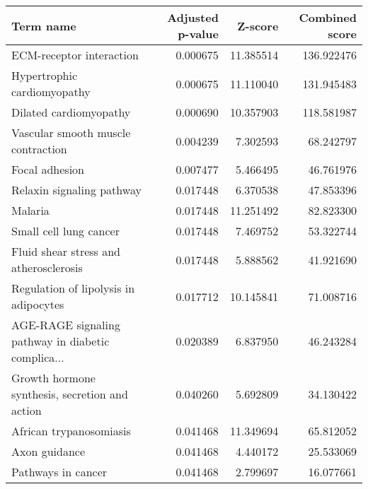 \begin{tabular}{lrrr}
\toprule
                                         Term name &  Adjusted p-value &   Z-score &  Combined score \\
\midrule
                          ECM-receptor interaction &          0.000675 & 11.385514 &      136.922476 \\
                       Hypertrophic cardiomyopathy &          0.000675 & 11.110040 &      131.945483 \\
                            Dilated cardiomyopathy &          0.000690 & 10.357903 &      118.581987 \\
                Vascular smooth muscle contraction &          0.004239 &  7.302593 &       68.242797 \\
                                    Focal adhesion &          0.007477 &  5.466495 &       46.761976 \\
                         Relaxin signaling pathway &          0.017448 &  6.370538 &       47.853396 \\
                                           Malaria &          0.017448 & 11.251492 &       82.823300 \\
                            Small cell lung cancer &          0.017448 &  7.469752 &       53.322744 \\
            Fluid shear stress and atherosclerosis &          0.017448 &  5.888562 &       41.921690 \\
             Regulation of lipolysis in adipocytes &          0.017712 & 10.145841 &       71.008716 \\
AGE-RAGE signaling pathway in diabetic complica... &          0.020389 &  6.837950 &       46.243284 \\
    Growth hormone synthesis, secretion and action &          0.040260 &  5.692809 &       34.130422 \\
                           African trypanosomiasis &          0.041468 & 11.349694 &       65.812052 \\
                                     Axon guidance &          0.041468 &  4.440172 &       25.533069 \\
                                Pathways in cancer &          0.041468 &  2.799697 &       16.077661 \\
\bottomrule
\end{tabular}
